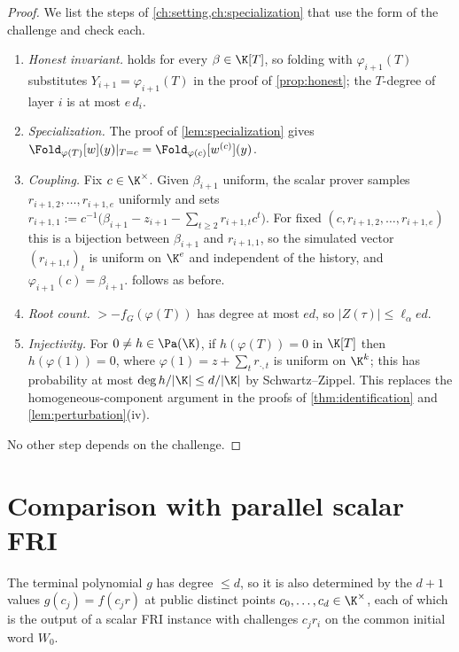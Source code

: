 \begin{proof}
We list the steps of \cref{ch:setting,ch:specialization} that use the form of the
challenge and check each.
\begin{enumerate}[label=\textup{(\roman*)}]
\item \emph{Honest invariant.}  holds for every $\beta\in\K[T]$, so
folding with $\varphi_{i+1}(T)$ substitutes $Y_{i+1}=\varphi_{i+1}(T)$ in the proof of
\cref{prop:honest}; the $T$-degree of layer $i$ is at most $e\,d_i$.
\item \emph{Specialization.} The proof of \cref{lem:specialization} gives
$\Fold_{\varphi(T)}[w](y)|_{T=c}=\Fold_{\varphi(c)}[w^{(c)}](y)$.
\item \emph{Coupling.} Fix $c\in\K^\times$. Given $\beta_{i+1}$ uniform, the scalar prover
samples $r_{i+1,2},\dots,r_{i+1,e}$ uniformly and sets
$r_{i+1,1}:=c^{-1}\bigl(\beta_{i+1}-z_{i+1}-\sum_{t\ge2}r_{i+1,t}c^t\bigr)$. For fixed
$(c,r_{i+1,2},\dots,r_{i+1,e})$ this is a bijection between $\beta_{i+1}$ and
$r_{i+1,1}$, so the simulated vector $(r_{i+1,t})_t$ is uniform on $\K^e$ and independent
of the history, and $\varphi_{i+1}(c)=\beta_{i+1}$.  follows as before.
\item \emph{Root count.} $\gt-f_G(\varphi(T))$ has degree at most $ed$, so
$|Z(\tau)|\le\ell_\alpha ed$.
\item \emph{Injectivity.} For $0\ne h\in\Pa(\K)$, if $h(\varphi(T))=0$ in $\K[T]$ then
$h(\varphi(1))=0$, where $\varphi(1)=z+\sum_tr_{\cdot,t}$ is uniform on $\K^k$; this has
probability at most $\deg h/|\K|\le d/|\K|$ by Schwartz--Zippel. This replaces the
homogeneous-component argument in the proofs of \cref{thm:identification} and
\cref{lem:perturbation}(iv).
\end{enumerate}
No other step depends on the challenge.
\end{proof}

\section{Comparison with parallel scalar FRI}

The terminal polynomial $g$ has degree $\le d$, so it is also determined by the $d+1$
values $g(c_j)=f(c_jr)$ at public distinct points $c_0,\dots,c_d\in\K^\times$, each of which
is the output of a scalar FRI instance with challenges $c_jr_i$ on the common initial word
$W_0$.

